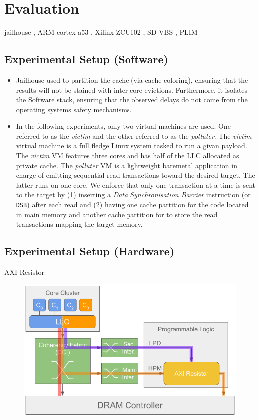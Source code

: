 \section{Evaluation}
    jailhouse \cite{jailhouse}, ARM cortex-a53 \cite{ARM-cortex-A53}, Xilinx ZCU102 \cite{Xilinx-ULTRASCALE-TRM}, SD-VBS \cite{SD-VBS}, PLIM \cite{PLIM20}
    \subsection{Experimental Setup (Software)}
        \begin{itemize}
            \item Jailhouse used to partition the cache (via cache coloring), ensuring that the results will not be stained with inter-core evictions. Furthermore, it isolates the Software stack, ensuring that the observed delays do not come from the operating systems safety mechanisms.
            \item In the following experiments, only two virtual machines are used. One referred to as the \emph{victim} and the other referred to as the \emph{polluter}. The \emph{victim} virtual machine is a full fledge Linux system tasked to run a givan payload. The \emph{victim} VM features three cores and has half of the LLC allocated as private cache. The \emph{polluter} VM is a lightweight baremetal application in charge of emitting sequential read transactions toward the desired target. The latter runs on one core. We enforce that only one transaction at a time is sent to the target by (1) inserting a \emph{Data Synchronisation Barrier} instruction (or \texttt{DSB}) after each read and (2) having one cache partition for the code located in main memory and another cache partition for to store the read transactions mapping the target memory.
        \end{itemize}

    \subsection{Experimental Setup (Hardware)}
        AXI-Resistor
        \begin{figure}
            \centering
            \includegraphics[scale=0.35]{images/Evaluation_setup.png}
            \caption{}
            \label{}
        \end{figure}

